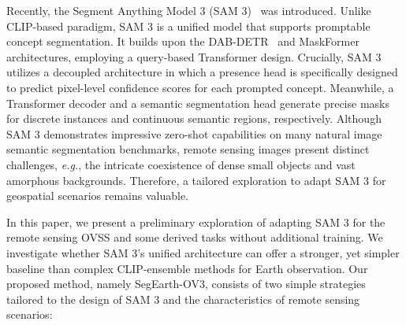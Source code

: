 \documentclass[twocolumn,switch,times]{article}
\newcommand{\samov}{SegEarth-OV\textcolor{cvprpink}{3}\xspace}
\begin{document}
Recently, the Segment Anything Model 3 (SAM 3)~\citep{carion2025sam} was introduced. Unlike CLIP-based paradigm, SAM 3 is a unified model that supports promptable concept segmentation. It builds upon the DAB-DETR~\citep{liu2022dab} and MaskFormer~\citep{cheng2021per, cheng2022masked} architectures, employing a query-based Transformer design. Crucially, SAM 3 utilizes a decoupled architecture in which a presence head is specifically designed to predict pixel-level confidence scores for each prompted concept. Meanwhile, a Transformer decoder and a semantic segmentation head generate precise masks for discrete instances and continuous semantic regions, respectively. Although SAM 3 demonstrates impressive zero-shot capabilities on many natural image semantic segmentation benchmarks, remote sensing images present distinct challenges, \textit{e.g.}, the intricate coexistence of dense small objects and vast amorphous backgrounds. Therefore, a tailored exploration to adapt SAM 3 for geospatial scenarios remains valuable.

In this paper, we present a preliminary exploration of adapting SAM 3 for the remote sensing OVSS and some derived tasks without additional training. We investigate whether SAM 3's unified architecture can offer a stronger, yet simpler baseline than complex CLIP-ensemble methods for Earth observation. Our proposed method, namely \samov, consists of two simple strategies tailored to the design of SAM 3 and the characteristics of remote sensing scenarios:
\end{document}
